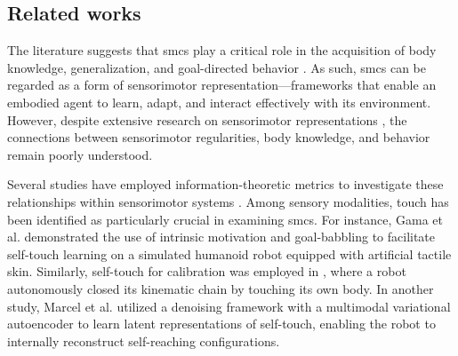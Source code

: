\subsection{Related works}

The literature suggests that \acp{smc} play a critical role in the acquisition of body knowledge, generalization, and goal-directed behavior \cite{Jacquey2019Sensorimotorcontingenciesas}. As such, \acp{smc} can be regarded as a form of sensorimotor representation---frameworks that enable an embodied agent to learn, adapt, and interact effectively with its environment. However, despite extensive research on sensorimotor representations \cite{Nguyen2021Sensorimotorrepresentationlearning}, the connections between sensorimotor regularities, body knowledge, and behavior remain poorly understood.

Several studies have employed information-theoretic metrics to investigate these relationships within sensorimotor systems \cite{Schmidt2013Bootstrappingperceptionusing,Lungarella2006Mappinginformationflow,Polani2009Modelsinformationprocessing,Bossomaier2016introductiontransferentropy,Olsson2006unknownsensorsactuators}. Among sensory modalities, touch has been identified as particularly crucial in examining \acp{smc}. For instance, Gama et al. \cite{Gama2021Goaldirectedtactile} demonstrated the use of intrinsic motivation and goal-babbling to facilitate self-touch learning on a simulated humanoid robot equipped with artificial tactile skin. Similarly, self-touch for calibration was employed in \cite{Roncone2014Automatickinematicchain}, where a robot autonomously closed its kinematic chain by touching its own body. In another study, Marcel et al. \cite{Marcel2022Learningreachown} utilized a denoising framework with a multimodal variational autoencoder to learn latent representations of self-touch, enabling the robot to internally reconstruct self-reaching configurations.

